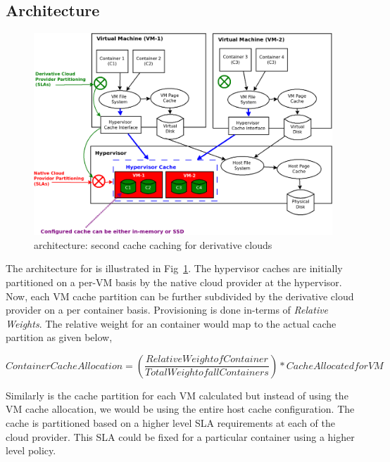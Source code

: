    \subsection{Architecture}
    \label{sec:double_decker_architecture}
    
      \begin{figure}
	\centering
	\includegraphics[width=1\textwidth]{images/background/double_decker.png}
	\caption{\dd{} architecture: second cache caching for derivative clouds}
	\label{img:doube_decker_architecure}
      \end{figure}
      
	The architecture for \dd{} is illustrated in Fig~\ref{img:doube_decker_architecure}. The hypervisor caches are initially partitioned on a per-VM
	basis by the native cloud provider at the hypervisor. Now, each VM cache partition can be further subdivided by the derivative cloud provider 
	on a per container basis. Provisioning is done in-terms of \textit{Relative Weights}. The relative weight for an container would map to the
	actual cache partition as given below,
	  
	  \begin{center}
	    \begin{equation}
	    \label{eq:cache_allocation}
	      Container Cache Allocation = ( \frac{Relative Weight of Container}{Total Weight of all Containers} ) * Cache Allocated for VM
	    \end{equation}
	  \end{center}
	  
	Similarly is the cache partition for each VM calculated but instead of using the VM cache allocation, we would be using the entire 
	host cache configuration. The cache is partitioned based on a higher level SLA requirements at each of the cloud provider. This SLA could
	be fixed for a particular container using a higher level policy. 
	  
